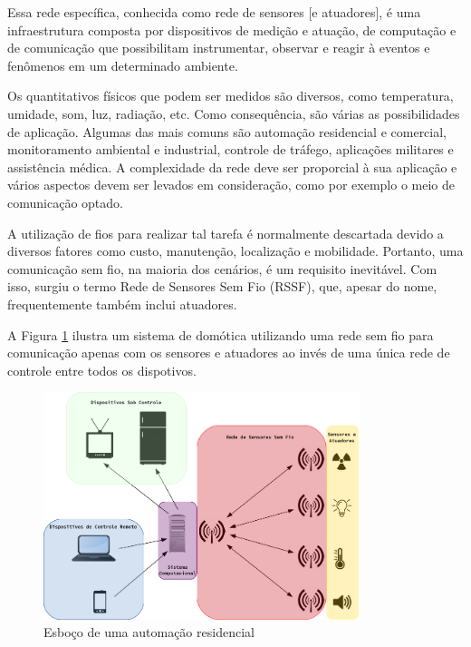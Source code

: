 Essa rede específica, conhecida como rede de sensores [e atuadores], é uma infraestrutura composta por
dispositivos de medição e atuação, de computação e de comunicação que possibilitam instrumentar, observar e
reagir à eventos e fenômenos em um determinado ambiente. \cite{sohraby_minoli_znati2007}

Os quantitativos físicos que podem ser medidos são diversos, como temperatura, umidade, som, luz, radiação,
etc. Como consequência, são várias as possibilidades de aplicação. Algumas das mais comuns são automação
residencial e comercial, monitoramento ambiental e industrial, controle de tráfego, aplicações militares e
assistência médica. A complexidade da rede deve ser proporcial à sua aplicação e vários aspectos devem ser
levados em consideração, como por exemplo o meio de comunicação optado.  \cite{kuorilehto2007}

A utilização de fios para realizar tal tarefa é normalmente descartada devido a diversos fatores como custo,
manutenção, localização e mobilidade. Portanto, uma comunicação sem fio, na maioria dos cenários, é um
requisito inevitável. Com isso, surgiu o termo Rede de Sensores Sem Fio (RSSF), que, apesar do nome,
frequentemente também inclui atuadores.  \cite{karl_willig2005}

A Figura \ref{figura:wsn} ilustra um sistema de domótica utilizando uma rede sem fio para comunicação apenas
com os sensores e atuadores ao invés de uma única rede de controle entre todos os dispotivos.

\begin{figure}[h]
	\centering
	\includegraphics[width=350]{../images/wsn.png}
	\caption{Esboço de uma automação residencial}
	\label{figura:wsn}
\end{figure}

